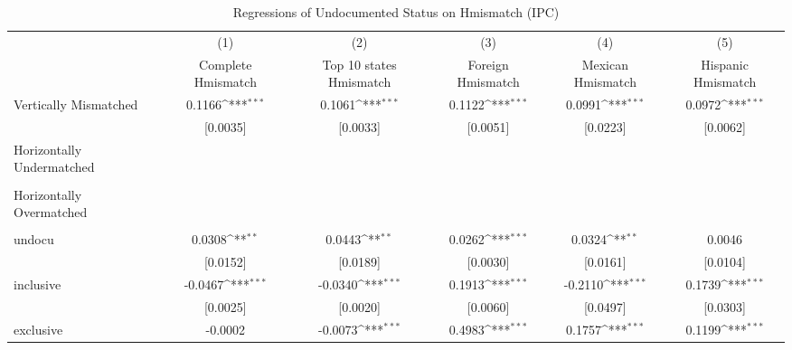 \begin{table}[htbp]\centering
\def\sym#1{\ifmmode^{#1}\else\(^{#1}\)\fi}
\caption{Regressions of Undocumented Status on Hmismatch (IPC)}
\begin{tabular}{l*{5}{c}}
\toprule
                    &\multicolumn{1}{c}{(1)}         &\multicolumn{1}{c}{(2)}         &\multicolumn{1}{c}{(3)}         &\multicolumn{1}{c}{(4)}         &\multicolumn{1}{c}{(5)}         \\
                    &Complete Hmismatch         &Top 10 states Hmismatch         &Foreign Hmismatch         &Mexican Hmismatch         &Hispanic Hmismatch         \\
\midrule
Vertically Mismatched&      0.1166\sym{***}&      0.1061\sym{***}&      0.1122\sym{***}&      0.0991\sym{***}&      0.0972\sym{***}\\
                    &    [0.0035]         &    [0.0033]         &    [0.0051]         &    [0.0223]         &    [0.0062]         \\
\addlinespace
Horizontally Undermatched&                     &                     &                     &                     &                     \\
                    &                     &                     &                     &                     &                     \\
\addlinespace
Horizontally Overmatched&                     &                     &                     &                     &                     \\
                    &                     &                     &                     &                     &                     \\
\addlinespace
undocu              &      0.0308\sym{**} &      0.0443\sym{**} &      0.0262\sym{***}&      0.0324\sym{**} &      0.0046         \\
                    &    [0.0152]         &    [0.0189]         &    [0.0030]         &    [0.0161]         &    [0.0104]         \\
\addlinespace
inclusive           &     -0.0467\sym{***}&     -0.0340\sym{***}&      0.1913\sym{***}&     -0.2110\sym{***}&      0.1739\sym{***}\\
                    &    [0.0025]         &    [0.0020]         &    [0.0060]         &    [0.0497]         &    [0.0303]         \\
\addlinespace
exclusive           &     -0.0002         &     -0.0073\sym{***}&      0.4983\sym{***}&      0.1757\sym{***}&      0.1199\sym{***}\\

\end{tabular}
\end{table}
